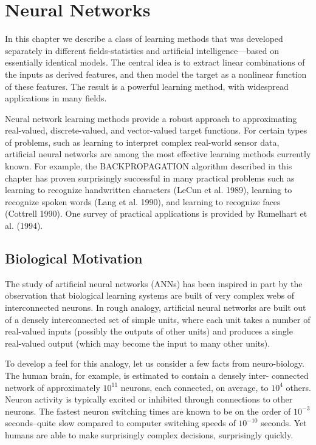 \documentclass[../main.tex]{subfiles}
\begin{document}
\section{Neural Networks}
In this chapter we describe a class of learning methods that was developed separately in different fields-statistics and artificial intelligence—based on essentially identical models. The central idea is to extract linear combinations of the inputs as derived features, and then model the target as a nonlinear function of these features. The result is a powerful learning method, with widespread applications in many fields.

Neural network learning methods provide a robust approach to approximating real-valued, discrete-valued, and vector-valued target functions. For certain types of problems, such as learning to interpret complex real-world sensor data, artificial neural networks are among the most effective learning methods currently known. For example, the BACKPROPAGATION algorithm described in this chapter has proven surprisingly successful in many practical problems such as learning to recognize handwritten characters (LeCun et al. 1989), learning to recognize spoken words (Lang et al. 1990), and learning to recognize faces (Cottrell 1990). One survey of practical applications is provided by Rumelhart et al. (1994).

\subsection{Biological Motivation}
The study of artificial neural networks (ANNs) has been inspired in part by the observation that biological learning systems are built of very complex webs of interconnected neurons. In rough analogy, artificial neural networks are built out of a densely interconnected set of simple units, where each unit takes a number of real-valued inputs (possibly the outputs of other units) and produces a single real-valued output (which may become the input to many other units).

To develop a feel for this analogy, let us consider a few facts from neuro-biology. The human brain, for example, is estimated to contain a densely inter- connected network of approximately $10^{11}$ neurons, each connected, on average, to $10^4$ others. Neuron activity is typically excited or inhibited through connections to other neurons. The fastest neuron switching times are known to be on the order of $10^{-3}$ seconds--quite slow compared to computer switching speeds of $10^{-10}$ seconds. Yet humans are able to make surprisingly complex decisions, surprisingly quickly.
\end{document}
